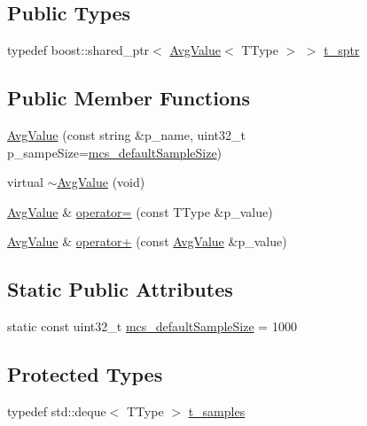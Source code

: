 \subsection*{Public Types}
\begin{DoxyCompactItemize}
\item 
typedef boost\+::shared\+\_\+ptr$<$ \hyperlink{classxtd_1_1counters_1_1AvgValue}{Avg\+Value}$<$ T\+Type $>$ $>$ \hyperlink{classxtd_1_1counters_1_1AvgValue_a2186c119cedc1cd9c3a7a7a39e0bdc55}{t\+\_\+sptr}
\end{DoxyCompactItemize}
\subsection*{Public Member Functions}
\begin{DoxyCompactItemize}
\item 
\hyperlink{classxtd_1_1counters_1_1AvgValue_aa6f20ce5b30cc7a781669cd6e4f70a6b}{Avg\+Value} (const string \&p\+\_\+name, uint32\+\_\+t p\+\_\+sampe\+Size=\hyperlink{classxtd_1_1counters_1_1AvgValue_aa65f0400547f2cb940ec9b79cbc3a662}{mcs\+\_\+default\+Sample\+Size})
\item 
virtual \hyperlink{classxtd_1_1counters_1_1AvgValue_ad9e1d371b0787698ebdf0350e58601c8}{$\sim$\+Avg\+Value} (void)
\item 
\hyperlink{classxtd_1_1counters_1_1AvgValue}{Avg\+Value} \& \hyperlink{classxtd_1_1counters_1_1AvgValue_a9605750713e85b4bf2e09e54e46d4e1a}{operator=} (const T\+Type \&p\+\_\+value)
\item 
\hyperlink{classxtd_1_1counters_1_1AvgValue}{Avg\+Value} \& \hyperlink{classxtd_1_1counters_1_1AvgValue_a52054872a2d938baf8c23e1208d7613a}{operator+} (const \hyperlink{classxtd_1_1counters_1_1AvgValue}{Avg\+Value} \&p\+\_\+value)
\end{DoxyCompactItemize}
\subsection*{Static Public Attributes}
\begin{DoxyCompactItemize}
\item 
static const uint32\+\_\+t \hyperlink{classxtd_1_1counters_1_1AvgValue_aa65f0400547f2cb940ec9b79cbc3a662}{mcs\+\_\+default\+Sample\+Size} = 1000
\end{DoxyCompactItemize}
\subsection*{Protected Types}
\begin{DoxyCompactItemize}
\item 
typedef std\+::deque$<$ T\+Type $>$ \hyperlink{classxtd_1_1counters_1_1AvgValue_aa58af8a852f52342b087373414e61878}{t\+\_\+samples}
\end{DoxyCompactItemize}
